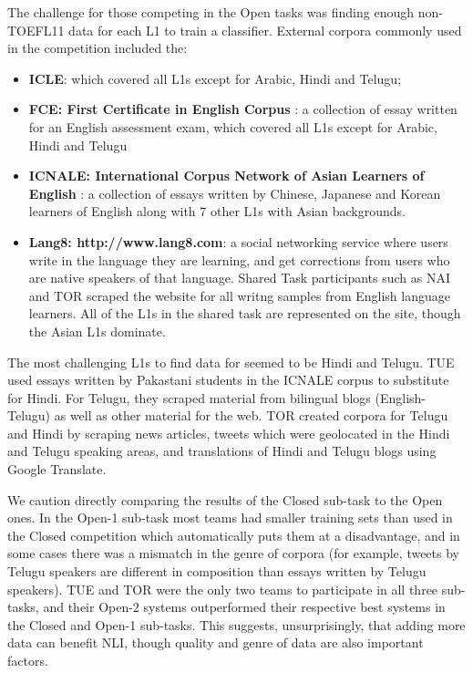 \documentclass[11pt,letterpaper]{article}
\begin{document}
The challenge for those
competing in the Open tasks was finding enough non-\textsc{TOEFL11} data for each L1
to train a classifier.  External corpora commonly used in the competition included
the:



\begin{itemize}
\item {\bf ICLE}: which covered all L1s except for Arabic, Hindi and Telugu;
\item {\bf FCE: First Certificate in English Corpus} \cite{yannakoudakis-briscoe-medlock:2011:ACL-HLT2011}: a collection
of essay written for an English assessment exam, which covered all L1s except for Arabic, Hindi and Telugu
\item {\bf ICNALE: International Corpus Network of Asian Learners of English} \cite{Ishikawa:2011}: a collection of essays
written by Chinese, Japanese and Korean learners of English along with 7 other L1s with Asian backgrounds.
\item {\bf Lang8: http://www.lang8.com}: a social networking service where users write in the
language they are learning, and get corrections from users who are native speakers of that language. Shared Task
participants such as NAI and TOR scraped the website for all writng samples from English language learners.
All of the L1s in the shared task are represented on the site, though the Asian L1s
dominate.
\end{itemize}

The most challenging L1s to find data for seemed to be Hindi and Telugu.  TUE used essays written by Pakastani
students in the ICNALE corpus to substitute for Hindi.  For Telugu, they scraped material from bilingual blogs
(English-Telugu) as well as other material for the web.  TOR created corpora for
Telugu and Hindi by scraping news articles, tweets which were geolocated in the
Hindi and Telugu speaking areas, and translations of Hindi and Telugu blogs using
Google Translate.

We caution directly comparing the results of the Closed sub-task to the Open ones.  In the Open-1 sub-task
most teams had smaller training sets than used in the Closed competition which automatically
puts them at a disadvantage, and in some cases there was a mismatch in the genre of corpora (for example, tweets
by Telugu speakers are different in composition than essays written by Telugu speakers).  TUE and TOR
were the only two teams to participate in all three sub-tasks, and their Open-2 systems outperformed
their respective best systems in the Closed and Open-1 sub-tasks.  This suggests, unsurprisingly, that
adding more data can benefit NLI, though quality and genre of data are also important factors.
\end{document}
